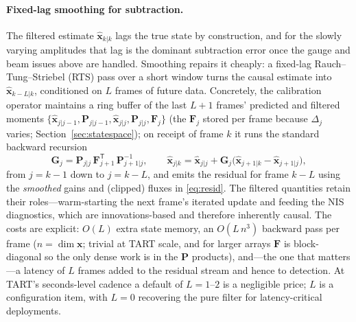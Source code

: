 \documentclass[11pt]{article}
\newcommand{\T}{^{\mathsf{T}}}
\begin{document}
\paragraph{Fixed-lag smoothing for subtraction.} The filtered estimate $\hat{\bm{x}}_{k|k}$ lags
the true state by construction, and for the slowly varying amplitudes that lag is the dominant
subtraction error once the gauge and beam issues above are handled. Smoothing repairs it cheaply: a
fixed-lag Rauch--Tung--Striebel (RTS) pass over a short window turns the causal estimate into
$\hat{\bm{x}}_{k-L|k}$, conditioned on $L$ frames of future data. Concretely, the calibration
operator maintains a ring buffer of the last $L{+}1$ frames' predicted and filtered moments
$\{\hat{\bm{x}}_{j|j-1},\bm{P}_{j|j-1},\hat{\bm{x}}_{j|j},\bm{P}_{j|j},\bm{F}_j\}$ (the $\bm{F}_j$
stored per frame because $\Delta_j$ varies; Section~\ref{sec:statespace}); on receipt of frame $k$
it runs the standard backward recursion
\begin{equation}
  \bm{G}_j=\bm{P}_{j|j}\,\bm{F}_{j+1}\T\,\bm{P}_{j+1|j}^{-1},\qquad
  \hat{\bm{x}}_{j|k}=\hat{\bm{x}}_{j|j}+\bm{G}_j\big(\hat{\bm{x}}_{j+1|k}-\hat{\bm{x}}_{j+1|j}\big),
\end{equation}
from $j=k-1$ down to $j=k-L$, and emits the residual for frame $k-L$ using the \emph{smoothed} gains
and (clipped) fluxes in \eqref{eq:resid}. The filtered quantities retain their roles---warm-starting
the next frame's iterated update and feeding the NIS diagnostics, which are innovations-based and
therefore inherently causal. The costs are explicit: $O(L)$ extra state memory, an $O(L\,n^3)$
backward pass per frame ($n=\dim\bm{x}$; trivial at TART scale, and for larger arrays $\bm{F}$ is
block-diagonal so the only dense work is in the $\bm{P}$ products), and---the one that matters---a
latency of $L$ frames added to the residual stream and hence to detection. At TART's seconds-level
cadence a default of $L=1$--$2$ is a negligible price; $L$ is a configuration item, with $L=0$
recovering the pure filter for latency-critical deployments.
\end{document}
